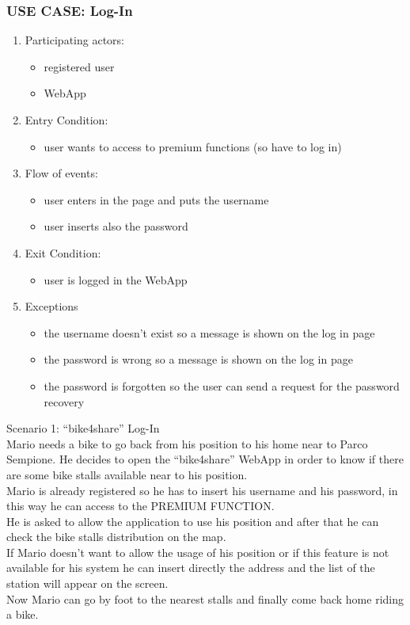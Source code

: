 \documentclass{article}
\begin{document}
\subsubsection{\textbf{USE CASE}: Log-In}
\begin{enumerate}
\item Participating actors: 
\begin{itemize}
    \item registered user
    \item WebApp
\end{itemize}
\item Entry Condition: 
\begin{itemize}
    \item user wants to access to premium functions (so have to log in)
\end{itemize}
\item Flow of events: 
\begin{itemize}
    \item user enters in the page and puts the username
    \item user inserts also the password
\end{itemize}
\item Exit Condition: 
\begin{itemize}
    \item user is logged in the WebApp
\end{itemize}
\item Exceptions
\begin{itemize}
    \item the username doesn’t exist so a message is shown on the log in page
    \item the password is wrong so a message is shown on the log in page
    \item the password is forgotten so the user can send a request for the password recovery
\end{itemize}
\end{enumerate}

Scenario 1: “bike4share” Log-In \\
Mario needs a bike to go back from his position to his home near to Parco Sempione. He decides to open the “bike4share” WebApp in order to know if there are some bike stalls available near to his position.\\ 
Mario is already registered so he has to insert his username and his password, in this way he can access to the PREMIUM FUNCTION.\\ 
He is asked to allow the application to use his position and after that he can check the bike stalls distribution on the map. \\
If Mario doesn’t want to allow the usage of his position or if this feature is not available for his system he can insert directly the address and the list of the station will appear on the screen.\\ Now Mario can go by foot to the nearest stalls and finally come back home riding a bike.
\end{document}
